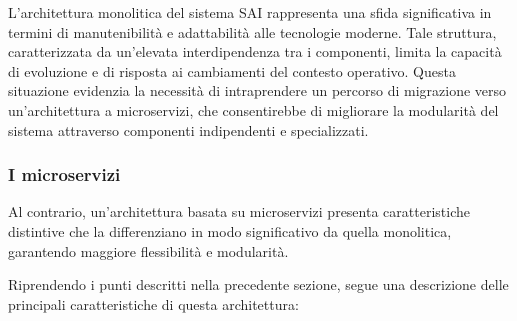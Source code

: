             \vspace{0.2 em}
            \noindent L'architettura monolitica del sistema SAI rappresenta una sfida significativa in termini di manutenibilità e adattabilità alle tecnologie moderne. Tale struttura, caratterizzata da un'elevata interdipendenza tra i componenti, limita la capacità di evoluzione e di risposta ai cambiamenti del contesto operativo. Questa situazione evidenzia la necessità di intraprendere un percorso di migrazione verso un'architettura a microservizi, che consentirebbe di migliorare la modularità del sistema attraverso componenti indipendenti e specializzati. 

            \subsubsection{I microservizi}
            
            Al contrario, un'architettura basata su microservizi presenta caratteristiche distintive che la differenziano in modo significativo da quella monolitica, garantendo maggiore flessibilità e modularità.            
            
            \noindent Riprendendo i punti descritti nella precedente sezione, segue una descrizione delle principali caratteristiche di questa architettura:  

